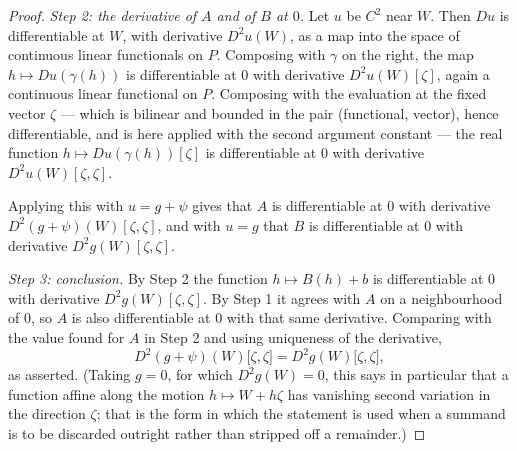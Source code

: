 \begin{proof}
\emph{Step 2: the derivative of $A$ and of $B$ at $0$.}
Let $u$ be $C^2$ near $W$. Then $Du$ is differentiable at $W$, with derivative
$D^2u(W)$, as a map into the space of continuous linear functionals on $P$. Composing
with $\gamma$ on the right, the map $h\mapsto Du(\gamma(h))$ is differentiable at $0$
with derivative $D^2u(W)[\zeta]$, again a continuous linear functional on $P$. Composing
with the evaluation at the fixed vector $\zeta$ --- which is bilinear and bounded in the
pair (functional, vector), hence differentiable, and is here applied with the second
argument constant --- the real function $h\mapsto Du(\gamma(h))[\zeta]$ is differentiable
at $0$ with derivative $D^2u(W)[\zeta,\zeta]$.

Applying this with $u=g+\psi$ gives that $A$ is differentiable at $0$ with derivative
$D^2(g+\psi)(W)[\zeta,\zeta]$, and with $u=g$ that $B$ is differentiable at $0$ with
derivative $D^2g(W)[\zeta,\zeta]$.

\emph{Step 3: conclusion.}
By Step 2 the function $h\mapsto B(h)+b$ is differentiable at $0$ with derivative
$D^2g(W)[\zeta,\zeta]$. By Step 1 it agrees with $A$ on a neighbourhood of $0$, so $A$ is
also differentiable at $0$ with that same derivative. Comparing with the value found for
$A$ in Step 2 and using uniqueness of the derivative,
\[
  D^2(g+\psi)(W)\bigl[\zeta,\zeta\bigr]=D^2g(W)\bigl[\zeta,\zeta\bigr],
\]
as asserted. (Taking $g=0$, for which $D^2g(W)=0$, this says in particular that a
function affine along the motion $h\mapsto W+h\zeta$ has vanishing second variation in
the direction $\zeta$; that is the form in which the statement is used when a summand is
to be discarded outright rather than stripped off a remainder.)
\end{proof}
